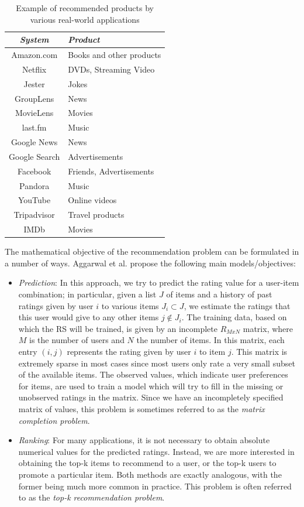 \documentclass[cic,tc,english]{iiufrgs}
\begin{document}
\begin{table}[ht!]
    \caption{Example of recommended products by various real-world applications}
    \centering
        \begin{tabular}{c|p{5cm}}
          \hline
          \textit{System}  &   \textit{Product}  \\
          \hline
          \hline
Amazon.com   & Books and other products  \\
Netflix  & DVDs, Streaming Video  \\
Jester  & Jokes  \\
GroupLens  & News  \\
MovieLens  & Movies  \\
last.fm  & Music  \\
Google News  & News  \\
Google Search  & Advertisements  \\
Facebook  & Friends, Advertisements  \\
Pandora  & Music  \\
YouTube  & Online videos  \\
Tripadvisor  & Travel products  \\
IMDb  & Movies  \\
          \hline
        \end{tabular}
    \label{tbl:system_examples}
\end{table}


The mathematical objective of the recommendation problem can be formulated in a number of ways. Aggarwal et al. \cite{Aggarwal2016} propose the following main models/objectives:
\begin{itemize}
\item \emph{Prediction}: In this approach, we try to predict the rating value for a user-item combination; in particular, given a list $J$ of items and a history of past ratings given by user $i$ to various items $J_i \subset J$, we estimate the ratings that this user would give to any other items $j \not\in J_i$. The training data, based on which the RS will be trained, is given by an incomplete $R_{MxN}$ matrix, where $M$ is the number of users and $N$ the number of items. In this matrix, each entry $(i,j)$ represents the rating given by user $i$ to item $j$. This matrix is extremely sparse in most cases since most users only rate a very small subset of the available items. The observed values, which indicate user preferences for items, are used to train a model which will try to fill in the missing or unobserved ratings in the matrix. Since we have an incompletely specified matrix of values, this problem is sometimes referred to as the \textit{matrix completion problem}.
\item \emph{Ranking}: For many applications, it is not necessary to obtain absolute numerical values for the predicted ratings. Instead, we are more interested in obtaining the top-k items to recommend to a user, or the top-k users to promote a particular item. Both methods are exactly analogous, with the former being much more common in practice. This problem is often referred to as the \textit{top-k recommendation problem}.
\end{itemize}
\end{document}
